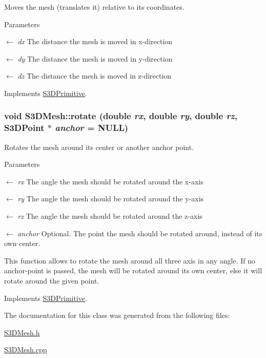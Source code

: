 Moves the mesh (translates it) relative to its coordinates. 


\begin{DoxyParams}{Parameters}
\item[\mbox{$\leftarrow$} {\em dx}]The distance the mesh is moved in x-\/direction \item[\mbox{$\leftarrow$} {\em dy}]The distance the mesh is moved in y-\/direction \item[\mbox{$\leftarrow$} {\em dz}]The distance the mesh is moved in z-\/direction \end{DoxyParams}


Implements \hyperlink{class_s3_d_primitive_a73a178ec2e1aa8e95f01baf0552724a9}{S3DPrimitive}.

\hypertarget{class_s3_d_mesh_affff1ac3ef33b293a9ec9881a4e13993}{
\subsubsection[{rotate}]{\setlength{\rightskip}{0pt plus 5cm}void S3DMesh::rotate (double {\em rx}, \/  double {\em ry}, \/  double {\em rz}, \/  {\bf S3DPoint} $\ast$ {\em anchor} = {\ttfamily NULL})}}
\label{class_s3_d_mesh_affff1ac3ef33b293a9ec9881a4e13993}


Rotates the mesh around its center or another anchor point. 


\begin{DoxyParams}{Parameters}
\item[\mbox{$\leftarrow$} {\em rx}]The angle the mesh should be rotated around the x-\/axis \item[\mbox{$\leftarrow$} {\em ry}]The angle the mesh should be rotated around the y-\/axis \item[\mbox{$\leftarrow$} {\em rz}]The angle the mesh should be rotated around the z-\/axis \item[\mbox{$\leftarrow$} {\em anchor}]Optional. The point the mesh should be rotated around, instead of its own center.\end{DoxyParams}
This function allows to rotate the mesh around all three axis in any angle. If no anchor-\/point is passed, the mesh will be rotated around its own center, else it will rotate around the given point. 

Implements \hyperlink{class_s3_d_primitive_a23eb36b6bd48643e8f7be4b950592d9e}{S3DPrimitive}.



The documentation for this class was generated from the following files:\begin{DoxyCompactItemize}
\item 
\hyperlink{_s3_d_mesh_8h}{S3DMesh.h}\item 
\hyperlink{_s3_d_mesh_8cpp}{S3DMesh.cpp}\end{DoxyCompactItemize}

